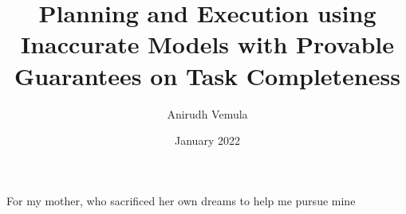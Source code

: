 \documentclass[11pt]{cmuthesis}
\begin{document}
\frontmatter

\pagestyle{empty}

\title{{\bf Planning and Execution using Inaccurate Models with
    Provable Guarantees on Task Completeness}}
\author{Anirudh Vemula}
\date{January 2022}


\support{}
\disclaimer{}


\maketitle

\begin{dedication}
  For my mother, who sacrificed her own dreams to help me pursue
  mine
\end{dedication}
\end{document}
